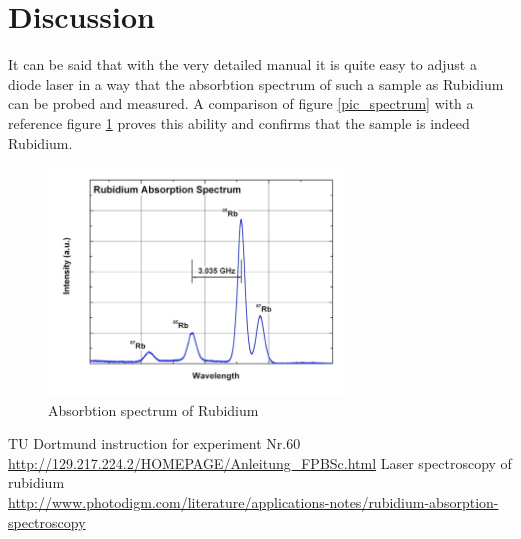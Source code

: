 \section{Discussion}
It can be said that with the very detailed manual it is quite easy to adjust a diode laser in a way that the absorbtion spectrum of such a sample as 
Rubidium can be probed and measured. A comparison of figure \ref{pic_spectrum} with a reference figure \ref{pic_ref} proves this ability and confirms that
the sample is indeed Rubidium.
\begin{figure}[H]
 \includegraphics[width=0.7\textwidth]{../pics/reference.jpg}
 \caption{Absorbtion spectrum of Rubidium \cite{ref}}
 \label{pic_ref}
\end{figure}


\begin{thebibliography}{WissOnl}
	 TU Dortmund instruction for experiment Nr.60 \url{http://129.217.224.2/HOMEPAGE/Anleitung_FPBSc.html}
	 Laser spectroscopy of rubidium \\ \url{http://www.photodigm.com/literature/applications-notes/rubidium-absorption-spectroscopy}
\end{thebibliography}




